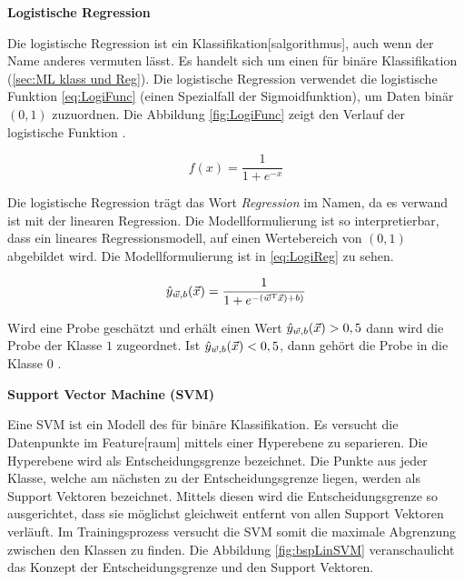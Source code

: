 \dubpar
\textbf{Logistische Regression} \par
Die logistische Regression ist ein \gls{Klassifikation}[salgorithmus], auch wenn der Name anderes vermuten lässt. Es handelt sich um einen  für binäre \gls{Klassifikation} (\ref{sec:ML klass und Reg}). Die logistische Regression verwendet die logistische Funktion \ref{eq:LogiFunc} (einen Spezialfall der Sigmoidfunktion), um Daten binär \((0,1)\) zuzuordnen. Die Abbildung \ref{fig:LogiFunc} zeigt den Verlauf der logistische Funktion \cite{Burkov.2019}. 

\begin{equation}
f(x) = \frac{1}{1 + e^{-x}}
\label{eq:LogiFunc}
\end{equation}


Die logistische Regression trägt das Wort \textit{Regression} im Namen, da es verwand ist mit der linearen Regression. Die Modellformulierung ist so interpretierbar, dass ein lineares Regressionsmodell, auf einen Wertebereich von \((0,1)\) abgebildet wird. Die Modellformulierung ist in \ref{eq:LogiReg} zu sehen.

\begin{equation}
\hat{y}_{\vec{w},b}(\vec{x}) = \frac{1}{1 + e^{-(\vec{w}^\mathrm{T}\vec{x})+b)}}
\label{eq:LogiReg}
\end{equation}

Wird eine Probe geschätzt und erhält einen Wert \(\hat{y}_{\vec{w},b}(\vec{x}) > 0,5\) dann wird die Probe der Klasse \(1\) zugeordnet. Ist \(\hat{y}_{\vec{w},b}(\vec{x}) < 0,5\), dann gehört die Probe in die Klasse \(0\) \cite{Burkov.2019, Goodfellow.2016}.

\dubpar
\textbf{Support Vector Machine (\acrshort{SVM})} \par
Eine \acrshort{SVM} ist ein Modell des  für binäre \gls{Klassifikation}. Es versucht die Datenpunkte im \gls{Feature}[raum] mittels einer Hyperebene zu separieren. Die Hyperebene wird als Entscheidungsgrenze bezeichnet. Die Punkte aus jeder Klasse, welche am nächsten zu der Entscheidungsgrenze liegen, werden als Support Vektoren bezeichnet. Mittels diesen wird die Entscheidungsgrenze so ausgerichtet, dass sie möglichst gleichweit entfernt von allen Support Vektoren verläuft. Im Trainingsprozess versucht die \acrshort{SVM} somit die maximale Abgrenzung zwischen den Klassen zu finden. Die Abbildung \ref{fig:bspLinSVM} veranschaulicht das Konzept der Entscheidungsgrenze und den Support Vektoren. 

